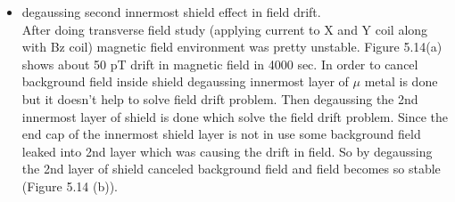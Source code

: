 \documentclass[12pt]{report}
\begin{document}
\begin{itemize}
   \item degaussing second innermost shield effect in field drift.\\
   After doing transverse field study (applying current to X and Y coil along with Bz coil) magnetic field environment was pretty unstable. Figure 5.14(a) shows about 50 pT drift in magnetic field in 4000 sec. In order to cancel background field inside shield degaussing innermost layer of $\mu$ metal is done but it doesn't help to solve field drift problem. Then degaussing the 2nd innermost layer of shield is done which solve the field drift problem. Since the end cap of the innermost shield layer is not in use some background field leaked into 2nd layer which was causing the drift in field. So by degaussing the 2nd layer of shield canceled background field and field becomes so stable (Figure 5.14 (b)).
   
  \begin{figure}
    \centering
 

\end{figure}
\end{itemize}
\end{document}
